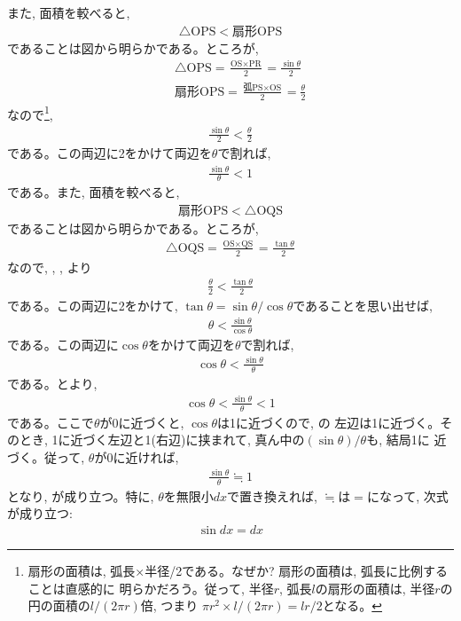 また, 面積を較べると, 
\begin{eqnarray}\bigtriangleup\text{OPS}<\text{扇形OPS}\end{eqnarray}
であることは図から明らかである。ところが, 
\begin{eqnarray}
&&\bigtriangleup\text{OPS}=\frac{\text{OS}\times\text{PR}}{2}=\frac{\sin\theta}{2}\\
&&\text{扇形OPS}=\frac{\text{弧PS}\times\text{OS}}{2}=\frac{\theta}{2}\label{eq:trigon_diff_5}
\end{eqnarray}
なので\footnote{扇形の面積は, 弧長×半径/2である。なぜか? 扇形の面積は, 弧長に比例することは直感的に
明らかだろう。従って, 半径$r$, 弧長$l$の扇形の面積は, 半径$r$の円の面積の$l/(2\pi r)$倍, つまり
$\pi r^2\times l/(2\pi r)=lr/2$となる。}, 
\begin{eqnarray}\frac{\sin\theta}{2}<\frac{\theta}{2}\end{eqnarray}
である。この両辺に2をかけて両辺を$\theta$で割れば, 
\begin{eqnarray}\frac{\sin\theta}{\theta}<1\label{eq:theta_sintheta1}\end{eqnarray}
である。また, 面積を較べると, 
\begin{eqnarray}\text{扇形OPS}<\bigtriangleup\text{OQS}\label{eq:trigon_diff_7}\end{eqnarray}
であることは図から明らかである。ところが, 
\begin{eqnarray}\bigtriangleup\text{OQS}=\frac{\text{OS}\times\text{QS}}{2}=\frac{\tan\theta}{2}\label{eq:trigon_diff_9}\end{eqnarray}
なので, , , より
\begin{eqnarray}\frac{\theta}{2}<\frac{\tan\theta}{2}\end{eqnarray}
である。この両辺に2をかけて, $\tan\theta=\sin\theta/\cos\theta$であることを思い出せば, 
\begin{eqnarray}\theta<\frac{\sin\theta}{\cos\theta}\end{eqnarray}
である。この両辺に$\cos\theta$をかけて両辺を$\theta$で割れば,
\begin{eqnarray}\cos\theta<\frac{\sin\theta}{\theta}\label{eq:theta_sintheta2}\end{eqnarray}
である。とより, 
\begin{eqnarray}\cos\theta<\frac{\sin\theta}{\theta}<1\label{eq:theta_sintheta3}\end{eqnarray}
である。ここで$\theta$が0に近づくと, $\cos\theta$は1に近づくので, の
左辺は1に近づく。そのとき, 1に近づく左辺と1(右辺)に挟まれて, 真ん中の$(\sin\theta)/\theta$も, 結局1に
近づく。従って, $\theta$が0に近ければ, 
\begin{eqnarray}\frac{\sin\theta}{\theta}\fallingdotseq 1\label{eq:theta_sintheta4}\end{eqnarray}
となり, が成り立つ。特に, $\theta$を無限小$dx$で置き換えれば, 
$\fallingdotseq$は$=$になって, 次式が成り立つ:
\begin{eqnarray}
\sin dx = dx\label{eq:sindx}
\end{eqnarray}


